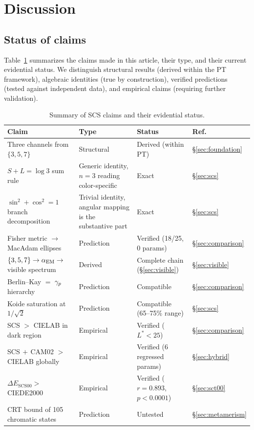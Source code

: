 \documentclass[12pt,a4paper]{article}
\begin{document}
\section{Discussion}
\label{sec:discussion}

\subsection{Status of claims}

Table~\ref{tab:claims} summarizes the claims made in this article,
their type, and their current evidential status. We distinguish
structural results (derived within the PT framework), algebraic
identities (true by construction), verified predictions (tested against
independent data), and empirical claims (requiring further validation).

\begin{table}[ht]
\centering
\caption{Summary of SCS claims and their evidential status.}
\label{tab:claims}
\begin{tabular}{llll}
\toprule
\textbf{Claim} & \textbf{Type} & \textbf{Status} & \textbf{Ref.} \\
\midrule
Three channels from $\{3,5,7\}$ & Structural & Derived (within PT) & \S\ref{sec:foundation} \\
$S + L = \log 3$ sum rule & Generic identity, $n=3$ reading color-specific & Exact & \S\ref{sec:scs} \\
$\sin^2 + \cos^2 = 1$ branch decomposition & Trivial identity, angular mapping is the substantive part & Exact & \S\ref{sec:scs} \\
Fisher metric $\to$ MacAdam ellipses & Prediction & Verified (18/25, 0 params) & \S\ref{sec:comparison} \\
$\{3,5,7\} \to \alpha_{\mathrm{EM}} \to$ visible spectrum & Derived & Complete chain (\S\ref{sec:visible}) & \S\ref{sec:visible} \\
Berlin--Kay $=$ $\gamma_{p}$ hierarchy & Prediction & Compatible & \S\ref{sec:comparison} \\
Koide saturation at $1/\sqrt{2}$ & Prediction & Compatible (65--75\% range) & \S\ref{sec:scs} \\
SCS $>$ CIELAB in dark region & Empirical & Verified ($L^*<25$) & \S\ref{sec:comparison} \\
SCS$\,+\,$CAM02 $>$ CIELAB globally & Empirical & Verified (6 regressed params) & \S\ref{sec:hybrid} \\
$\Delta E_{\mathrm{SCS00}} >$ CIEDE2000 & Empirical & Verified ($r=0.893$, $p<0.0001$) & \S\ref{sec:sct00} \\
CRT bound of 105 chromatic states & Prediction & Untested & \S\ref{sec:metamerism} \\
\bottomrule
\end{tabular}
\end{table}
\end{document}
